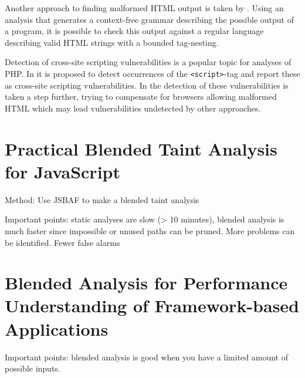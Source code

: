 Another approach to finding malformed HTML output is taken by . Using an analysis that generates a context-free grammar describing the possible output of a program, it is possible to check this output against a regular language describing valid HTML strings with a bounded tag-nesting.

Detection of cross-site scripting vulnerabilities is a popular topic for analyses of PHP. In  it is proposed to detect occurrences of the \texttt{<script>}-tag and report these as cross-site scripting vulnerabilities. In  the detection of these vulnerabilities is taken a step further, trying to compensate for browsers allowing malformed HTML which may lead vulnerabilities undetected by other approaches.

\section{Practical Blended Taint Analysis for JavaScript}
Method: Use JSBAF to make a blended taint analysis

Important points: static analyses are slow (> 10 minutes), blended analysis is much faster since impossible or unused paths can be pruned. More problems can be identified. Fewer false alarms

\section{Blended Analysis for Performance Understanding of Framework-based Applications}
Important points: blended analysis is good when you have a limited amount of possible inputs.
